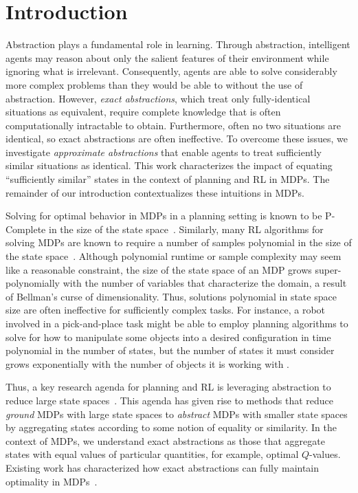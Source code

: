 \section{Introduction}
\label{sec:intro}

Abstraction plays a fundamental role in learning. Through abstraction, intelligent agents may reason about only the salient features of their environment while ignoring what is irrelevant. Consequently, agents are able to solve considerably more complex problems than they would be able to without the use of abstraction. However, \textit{exact abstractions}, which treat only fully-identical situations as equivalent, require complete knowledge that is often computationally intractable to obtain. Furthermore, often no two situations are identical, so exact abstractions are often ineffective. To overcome these issues, we investigate \textit{approximate abstractions} that enable agents to treat sufficiently similar situations as identical. This work characterizes the impact of equating ``sufficiently similar'' states in the context of planning and \ac{RL} in \acp{MDP}. The remainder of our introduction contextualizes these intuitions in \acp{MDP}.

Solving for optimal behavior in \acp{MDP} in a planning setting is known to be P-Complete in the size of the state space~\cite{papadimitriou1987complexity,littman1995complexity}. Similarly, many \ac{RL} algorithms for solving \acp{MDP} are known to require a number of samples polynomial in the size of the state space~\cite{strehl2009reinforcement}. Although polynomial runtime or sample complexity may seem like a reasonable constraint, the size of the state space of an \ac{MDP} grows super-polynomially with the number of variables that characterize the domain, a result of Bellman's curse of dimensionality. Thus, solutions polynomial in state space size are often ineffective for sufficiently complex tasks.  For instance, a robot involved in a pick-and-place task might be able to employ planning algorithms to solve for how to manipulate some objects into a desired configuration in time polynomial in the number of states, but the number of states it must consider grows exponentially with the number of objects it is working with .

Thus, a key research agenda for planning and \ac{RL} is leveraging abstraction to reduce large state spaces~\cite{andre2002state,jong2005state,dietterich2000hierarchical,Bean2011}. This agenda has given rise to methods that reduce \textit{ground} \acp{MDP} with large state spaces to \textit{abstract} MDPs with smaller state spaces by aggregating states according to some notion of equality or similarity. In the context of \acp{MDP}, we understand exact abstractions as those that aggregate states with equal values of particular quantities, for example, optimal $Q$-values. Existing work has characterized how exact abstractions can fully maintain optimality in \acp{MDP}~\cite{li2006towards,dean1997modelmin}. 

